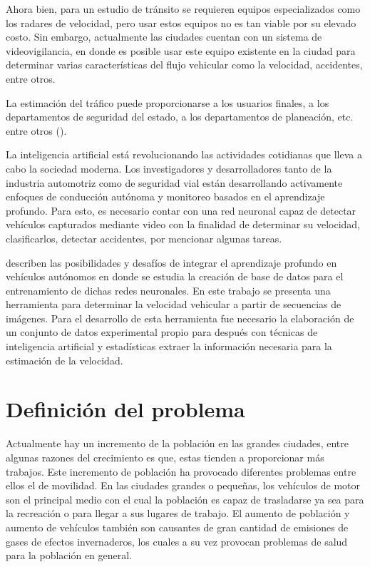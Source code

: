 Ahora bien, para un estudio de tránsito se requieren equipos especializados como los radares de velocidad, pero usar estos equipos no es tan viable por su elevado costo. Sin embargo, actualmente las ciudades cuentan con un sistema de videovigilancia, en donde es posible usar este equipo existente en la ciudad para determinar varias características del flujo vehicular como la velocidad, accidentes, entre otros.

La estimación del tráfico puede proporcionarse a los usuarios finales, a los departamentos de seguridad del estado, a los departamentos de planeación, etc. entre otros (\cite{impedovo2019Vehicular}).

La inteligencia artificial está revolucionando las actividades cotidianas que lleva a cabo la sociedad moderna. Los investigadores y desarrolladores tanto de la industria automotriz como de seguridad vial están desarrollando activamente enfoques de conducción autónoma y monitoreo basados en el aprendizaje profundo. Para esto, es necesario contar con una red neuronal capaz de detectar vehículos capturados mediante video con la finalidad de determinar su velocidad, clasificarlos, detectar accidentes, por mencionar algunas tareas.

\cite{rao2018Deep} describen las posibilidades y desafíos de integrar el aprendizaje profundo en vehículos autónomos en donde se estudia la creación de base de datos para el entrenamiento de dichas redes neuronales. En este trabajo se presenta una herramienta para determinar la velocidad vehicular a partir de secuencias de imágenes. Para el desarrollo de esta herramienta fue necesario la elaboración de un conjunto de datos experimental propio para después con técnicas de inteligencia artificial y estadísticas extraer la información necesaria para la estimación de la velocidad.



\section{Definición del problema}

Actualmente hay un incremento de la población en las grandes ciudades, entre algunas razones del crecimiento es que, estas tienden a proporcionar más trabajos. Este incremento de población ha provocado diferentes problemas entre ellos el de movilidad. En las ciudades grandes o pequeñas, los vehículos de motor son el principal medio con el cual la población es capaz de trasladarse ya sea para la recreación o para llegar a sus lugares de trabajo. El aumento de población y aumento de vehículos también son causantes de gran cantidad de emisiones de gases de efectos invernaderos, los cuales a su vez provocan problemas de salud para la población en general.

